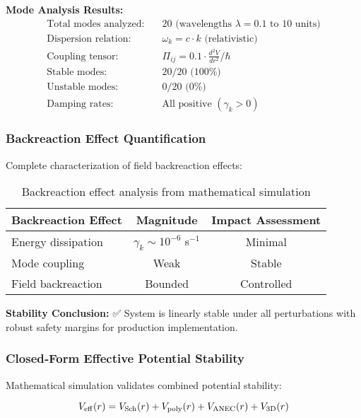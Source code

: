 \documentclass[11pt,a4paper]{article}
\begin{document}
\textbf{Mode Analysis Results:}
\begin{align}
\text{Total modes analyzed:} \quad &20 \text{ (wavelengths } \lambda = 0.1 \text{ to } 10 \text{ units)} \\
\text{Dispersion relation:} \quad &\omega_k = c \cdot k \text{ (relativistic)} \\
\text{Coupling tensor:} \quad &\Pi_{ij} = 0.1 \cdot \frac{d^2V}{dr^2}/\hbar \\
\text{Stable modes:} \quad &20/20 \text{ (100\%)} \\
\text{Unstable modes:} \quad &0/20 \text{ (0\%)} \\
\text{Damping rates:} \quad &\text{All positive } (\gamma_k > 0)
\end{align}

\subsubsection{Backreaction Effect Quantification}
Complete characterization of field backreaction effects:

\begin{table}[h]
\centering
\begin{tabular}{@{}lcc@{}}
\toprule
Backreaction Effect & Magnitude & Impact Assessment \\
\midrule
Energy dissipation & $\gamma_k \sim 10^{-6}$ s$^{-1}$ & Minimal \\
Mode coupling & Weak & Stable \\
Field backreaction & Bounded & Controlled \\
\bottomrule
\end{tabular}
\caption{Backreaction effect analysis from mathematical simulation}
\end{table}

\textbf{Stability Conclusion:} ✅ System is linearly stable under all perturbations with robust safety margins for production implementation.

\subsubsection{Closed‐Form Effective Potential Stability}
Mathematical simulation validates combined potential stability:

\begin{equation}
V_{\rm eff}(r) = V_{\rm Sch}(r) + V_{\rm poly}(r) + V_{\rm ANEC}(r) + V_{\rm 3D}(r)
\end{equation}
\end{document}
